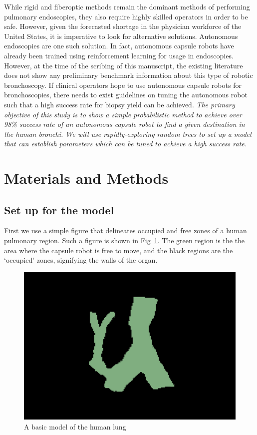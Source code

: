 \documentclass[conference]{IEEEtran}
\begin{document}
While rigid and fiberoptic 
methods remain the dominant methods of performing pulmonary
endoscopies\cite{Lu2021}, they also require highly skilled
operators in order to be safe\cite{Stahl2015}. However,
given the forecasted shortage in the physician workforce
of the United States\cite{Zhang2020}, it is imperative
to look for alternative solutions. Autonomous endoscopies
are one such solution. In fact, autonomous capsule robots
have already been trained using reinforcement learning
for usage in endoscopies\cite{Turan2019}.\\

However, at
the time of the scribing of this manuscript, the existing
literature does not show any preliminary benchmark information
about this type of robotic bronchoscopy. If clinical operators
hope to use autonomous capsule robots for bronchoscopies, there needs
to exist guidelines on tuning the autonomous robot such that a
high success rate for biopsy yield can be achieved.
\textit{
The primary objective of this study is to show a
simple probabilistic method
to achieve over 98\% success rate of an autonomous capsule
robot to find a given destination in the human bronchi.
We will use rapidly-exploring random trees to set up a model that
can establish parameters which can be tuned to achieve a high success
rate.}

\section{Materials and Methods}

\subsection{Set up for the model}
First we use a simple figure that delineates occupied and free zones
of a human pulmonary region. Such a figure is shown in Fig~\ref{given-lung-fig}.
The green region is the the area where the capsule robot is free to move, and
the black regions are the `occupied' zones, signifying the walls of the
organ.

\begin{figure}[h]
    \centering
    \includegraphics[scale=0.11]{939-Oblique.png}
    \caption{A basic model of the human lung}
    \label{given-lung-fig}    
\end{figure}
\end{document}
